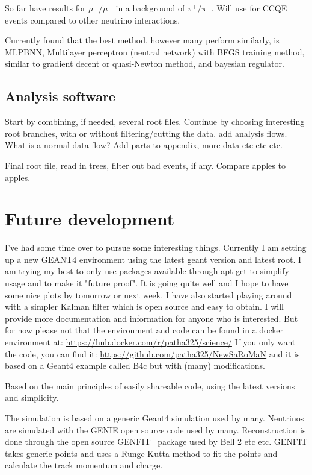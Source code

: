 So far have results for $\mu^+/\mu^-$ in a background of  $\pi^+/\pi^-$. Will use for CCQE events compared to other neutrino interactions.

Currently found that the best method, however many perform similarly, is MLPBNN, Multilayer perceptron (neutral network) with BFGS training method, similar to gradient decent or quasi-Newton method, and bayesian regulator.

\subsection{Analysis software}
Start by combining, if needed, several root files. Continue by choosing interesting root branches, with or without filtering/cutting the data.
add analysis flows. What is a normal data flow? Add parts to appendix, more data etc etc etc.

Final root file, read in trees, filter out bad events, if any. Compare apples to apples. 

\pagebreak
\section{Future development}
I've had some time over to pursue some interesting things. Currently I am setting up a new GEANT4 environment using the latest geant version and latest root. I am trying my best to only use packages available through apt-get to simplify usage and to make it "future proof". It is going quite well and I hope to have some nice plots by tomorrow or next week. I have also started playing around with a simpler Kalman filter which is open source and easy to obtain. I will provide more documentation and information for anyone who is interested. But for now please not that the environment and code can be found in  a docker environment at: \url{https://hub.docker.com/r/patha325/science/} If you only want the code, you can find it: \url{https://github.com/patha325/NewSaRoMaN} and it is based on a Geant4 example called B4c but with (many) modifications.

Based on the main principles of easily shareable code, using the latest versions and simplicity.

The simulation is based on a generic Geant4 simulation used by many. Neutrinos are simulated with the GENIE open source code used by many. Reconstruction is done through the open source GENFIT~\cite{81Genfit} package used by Bell 2 etc etc. GENFIT takes generic points and uses a Runge-Kutta method to fit the points and calculate the track momentum and charge.

